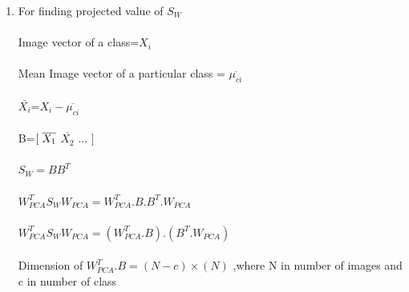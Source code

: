 \documentclass[a4paper,10pt]{report}
\begin{document}
\begin{enumerate}
 \item For finding projected value of $S_W$ \\ \\
 Image vector of a class=$X_i$\\ \\
 Mean Image vector of a particular class = $\overline{\mu_{ci}}$\\ \\
 $\overline{X_i}$=$X_i-\overline{\mu_{ci}}$\\ \\
 B=$[\hspace{0.1cm} \overline{X_1}$  \hspace{0.2cm}   $\overline{X_2}$ \hspace{0.2cm}... $ ] $\\ \\ 
 $S_W = BB^T$\\ \\ 
 $W_{PCA}^T S_W W_{PCA}= W_{PCA}^T.B.B^T.W_{PCA} $\\ \\
 $W_{PCA}^T S_W W_{PCA}= (W_{PCA}^T.B).(B^T.W_{PCA}) $ \\ \\
 Dimension of $W_{PCA}^T.B=(N-c) \times (N) $ ,where N in number of images and c in number of class \\ 
 
 
\end{enumerate}
\end{document}
